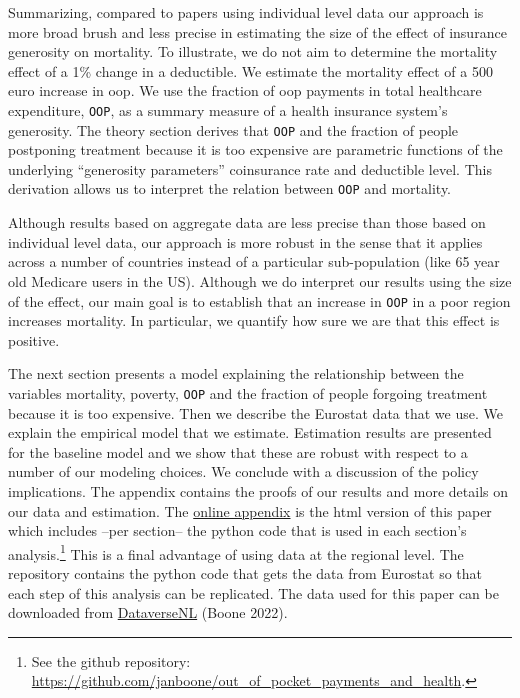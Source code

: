 \documentclass[a4paper,12pt]{article}
\makeatletter
\newcommand{\citeprocitem}[2]{\hyper@linkstart{cite}{citeproc_bib_item_#1}#2\hyper@linkend}
\makeatother
\begin{document}
Summarizing, compared to papers using individual level data our approach is more broad brush and less precise in estimating the size of the effect of insurance generosity on mortality. To illustrate, we do not aim to determine the mortality effect of a 1\% change in a deductible. We estimate the mortality effect of a 500 euro increase in oop. We use the fraction of oop payments in total healthcare expenditure, \texttt{OOP}, as a summary measure of a health insurance system's generosity. The theory section derives that \texttt{OOP} and the fraction of people postponing treatment because it is too expensive are parametric functions of the underlying ``generosity parameters'' coinsurance rate and deductible level. This derivation allows us to interpret the relation between \texttt{OOP} and mortality.

Although results based on aggregate data are less precise than those based on individual level data, our approach is more robust in the sense that it applies across a number of countries instead of a particular sub-population (like 65 year old Medicare users in the US). Although we do interpret our results using the size of the effect, our main goal is to establish that an increase in \texttt{OOP} in a poor region increases mortality. In particular, we quantify how sure we are that this effect is positive.

The next section presents a model explaining the relationship between the variables mortality, poverty, \texttt{OOP} and the fraction of people forgoing treatment because it is too expensive. Then we describe the Eurostat data that we use. We explain the empirical model that we estimate. Estimation results are presented for the baseline model and we show that these are robust with respect to a number of our modeling choices. We conclude with a discussion of the policy implications. The appendix contains the proofs of our results and more details on our data and estimation. The \href{https://janboone.github.io/out\_of\_pocket\_payments\_and\_health/index.html}{online appendix} is the html version of this paper which includes --per section-- the python code that is used in each section's analysis.\footnote{See the github repository: \url{https://github.com/janboone/out\_of\_pocket\_payments\_and\_health}.} This is a final advantage of using data at the regional level. The repository contains the python code that gets the data from Eurostat so that each step of this analysis can be replicated. The data used for this paper can be downloaded from \href{https://dataverse.nl/dataset.xhtml?persistentId=doi:10.34894/AABEBD}{DataverseNL} (\citeprocitem{4}{Boone 2022}).
\end{document}
